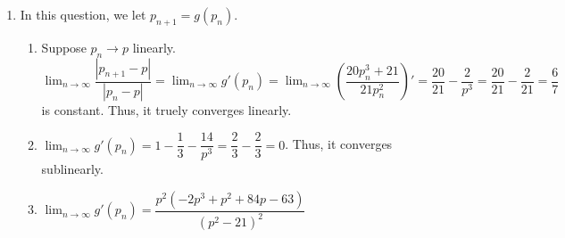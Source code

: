 \documentclass[12pt]{article}
\begin{document}
\begin{enumerate}
    \item In this question, we let $p_{n+1} = g(p_n)$.
    
    \begin{enumerate}
        \item Suppose $p_n\to p$ linearly. 
        $\displaystyle\lim_{n\to\infty} \dfrac{|p_{n+1} - p|}{|p_n - p|} = \displaystyle\lim_{n\to\infty} g'(p_n) = \displaystyle\lim_{n\to\infty} (\dfrac{20p_n^3 + 21}{21p_n^2})' = \dfrac{20}{21} - \dfrac{2}{p^3} = \dfrac{20}{21} - \dfrac{2}{21} = \dfrac{6}{7}$ is constant.
        Thus, it truely converges linearly.

        \item $\displaystyle\lim_{n\to\infty} g'(p_n) = 1 - \dfrac{1}{3} - \dfrac{14}{p^3} = \dfrac{2}{3} - \dfrac{2}{3} = 0$.
        Thus, it converges sublinearly.

        \item $\displaystyle\lim_{n\to\infty} g'(p_n) = \dfrac{p^2(-2p^3 + p^2 + 84p - 63)}{(p^2-21)^2}$
    \end{enumerate}
\end{enumerate}
\end{document}
